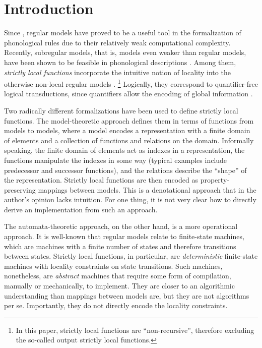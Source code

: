 \documentclass[11pt]{article}
\theoremstyle{definition}
\theoremstyle{plain}
\begin{document}
\section{Introduction}
Since \citet{kk94rmprs}, regular models have proved to be a useful
tool in the formalization of phonological rules due to their
relatively weak computational complexity.  Recently, subregular
models, that is, models even weaker than regular models, have been
shown to be feasible in phonological descriptions \citep{rp11apresh}.
Among them, \emph{strictly local functions} incorporate the intuitive
notion of locality into the otherwise non-local regular models
\citep{c14slpp}.%
\footnote{In this paper, strictly local functions are
  \enquote{non-recursive}, therefore excluding the so-called output
  strictly local functions.}
%
Logically, they correspond to quantifier-free logical transductions,
since quantifiers allow the encoding of global information
\citep{cj19qlfpfp, cj21iolr}.

Two radically different formalizations have been used to define
strictly local functions.  The model-theoretic approach defines them
in terms of functions from models to models, where a model encodes
a representation with a finite domain of elements and a collection of
functions and relations on the domain.  Informally speaking, the
finite domain of elements act as indexes in a representation, the
functions manipulate the indexes in some way (typical examples include
predecessor and successor functions), and the relations describe the
\enquote{shape} of the representation.  Strictly local functions are
then encoded as property-preserving mappings between models.  This is
a denotational approach that in the author's opinion lacks intuition.
For one thing, it is not very clear how to directly derive an
implementation from such an approach.

The automata-theoretic approach, on the other hand, is a more
operational approach.  It is well-known that regular models relate to
finite-state machines, which are machines with a finite number of
states and therefore transitions between states.  Strictly local
functions, in particular, are \emph{deterministic} finite-state
machines with locality constraints on state transitions.  Such
machines, nonetheless, are \emph{abstract} machines that require some
form of compilation, manually or mechanically, to implement.  They are
closer to an algorithmic understanding than mappings between models
are, but they are not algorithms per se.  Importantly, they do not
directly encode the locality constraints.
\end{document}
